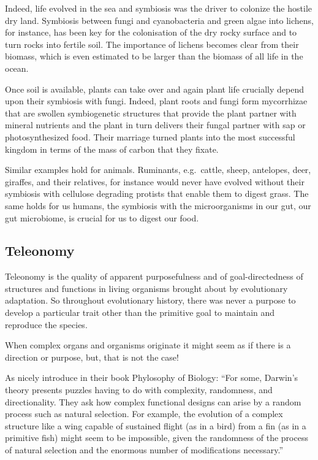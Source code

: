 \documentclass[
  11pt,
]{book}
\begin{document}
Indeed, life evolved in the sea and symbiosis was the driver to colonize the hostile dry land. Symbiosis between fungi and cyanobacteria and green algae into lichens, for instance, has been key for the colonisation of the dry rocky surface and to turn rocks into fertile soil. The importance of lichens becomes clear from their biomass, which is even estimated to be larger than the biomass of all life in the ocean.

Once soil is available, plants can take over and again plant life crucially depend upon their symbiosis with fungi. Indeed, plant roots and fungi form mycorrhizae that are swollen symbiogenetic structures that provide the plant partner with mineral nutrients and the plant in turn delivers their fungal partner with sap or photosynthesized food. Their marriage turned plants into the most successful kingdom in terms of the mass of carbon that they fixate.

Similar examples hold for animals. Ruminants, e.g.~cattle, sheep, antelopes, deer, giraffes, and their relatives, for instance would never have evolved without their symbiosis with cellulose degrading protists that enable them to digest grass. The same holds for us humans, the symbiosis with the microorganisms in our gut, our gut microbiome, is crucial for us to digest our food.

\hypertarget{teleonomy}{%
\subsection{Teleonomy}\label{teleonomy}}

Teleonomy is the quality of apparent purposefulness and of goal-directedness of structures and functions in living organisms brought about by evolutionary adaptation. So throughout evolutionary history, there was never a purpose to develop a particular trait other than the primitive goal to maintain and reproduce the species.

When complex organs and organisms originate it might seem as if there is a direction or purpose, but, that is not the case!

As \citet{rosenberg2008} nicely introduce in their book Phylosophy of Biology: ``For some, Darwin's theory presents puzzles having to do with complexity, randomness, and directionality. They ask how complex functional designs can arise by a random process such as natural selection. For example, the evolution of a complex structure like a wing capable of sustained flight (as in a bird) from a fin (as in a primitive fish) might seem to be impossible, given the randomness of the process of natural selection and the enormous number of modifications necessary.''
\end{document}
